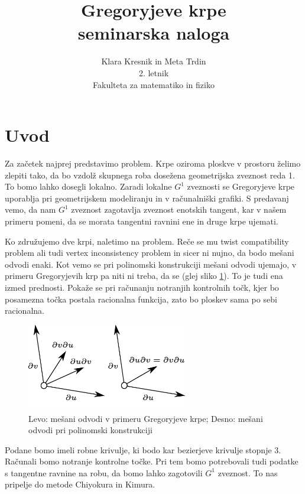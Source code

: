 \documentclass[a4paper,12pt]{article}
\title{Gregoryjeve krpe\\
\Large seminarska naloga}
\date{}
\author{Klara Kresnik in Meta Trdin\\
2. letnik\\
Fakulteta za matematiko in fiziko\\
}
\begin{document}
\maketitle
\pagebreak



\section{Uvod}
Za začetek najprej predstavimo problem. Krpe oziroma ploskve v prostoru želimo zlepiti tako, da bo vzdolž skupnega roba dosežena geometrijska zveznost reda 1. To bomo lahko dosegli lokalno. Zaradi lokalne $G^1$ zveznosti se Gregoryjeve krpe uporablja pri geometrijskem modeliranju in v računalniški grafiki. S predavanj vemo, da nam $G^1$ zveznost zagotavlja zveznost enotskih tangent, kar v našem primeru pomeni, da se morata tangentni ravnini ene in druge krpe ujemati.

Ko združujemo dve krpi, naletimo na problem. Reče se mu twist compatibility problem ali tudi vertex inconsistency problem in sicer ni nujno, da bodo mešani odvodi enaki.
Kot vemo se pri polinomski konstrukciji mešani odvodi ujemajo, v primeru Gregoryjevih krp pa niti ni treba, da se (glej sliko \ref{fig:mesani odvodi}). To je tudi ena izmed prednosti. Pokaže se pri računanju notranjih kontrolnih točk, kjer bo posamezna točka postala racionalna funkcija, zato bo ploskev sama po sebi racionalna.

\begin{figure}[h]
	\centering
	\includegraphics[width=7cm]{mesani_odvodi_ob.jpg}
	\caption{Levo: mešani odvodi v primeru Gregoryjeve krpe; Desno: mešani odvodi pri polinomski konstrukciji}
	\label{fig:mesani odvodi}
\end{figure}

Podane bomo imeli robne krivulje, ki bodo kar bezierjeve krivulje stopnje $3$. Računali bomo notranje kontrolne točke. Pri tem bomo potrebovali tudi podatke s tangentne ravnine na robu, da bomo lahko zagotovili $G^1$ zveznost. To nas pripelje do metode Chiyokura in Kimura. 
\end{document}

